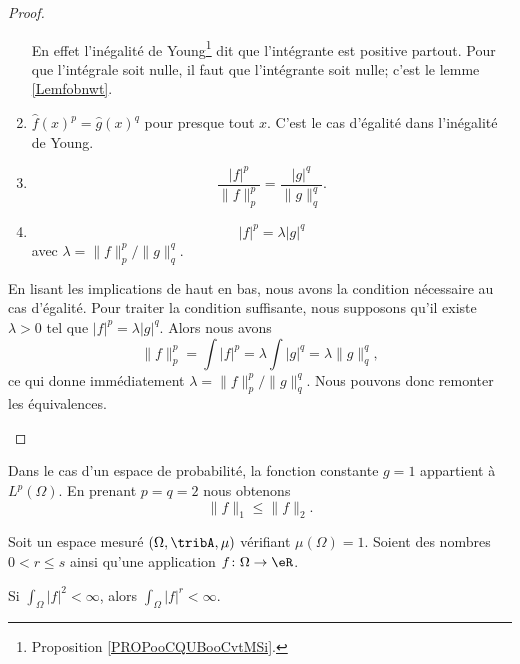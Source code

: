 \begin{proof}
\begin{subproof}
\begin{subproof}
\begin{enumerate}
				      En effet l'inégalité de Young\footnote{Proposition \ref{PROPooCQUBooCvtMSi}.} dit que l'intégrante est positive partout. Pour que l'intégrale soit nulle, il faut que l'intégrante soit nulle; c'est le lemme \ref{Lemfobnwt}.
				\item \( \hat f(x)^p=\hat g(x)^q\) pour presque tout \( x\). C'est le cas d'égalité dans l'inégalité de Young.
				\item
				      \begin{equation}
					      \frac{ | f |^p }{ \| f \|_p^p }=\frac{ | g |^q }{ \| g \|_q^q }.
				      \end{equation}
				\item
				      \begin{equation}
					      | f |^p=\lambda | g |^q
				      \end{equation}
				      avec \( \lambda=\| f \|_p^p/\| g \|_q^q\).
			\end{enumerate}
			\spitem[Conclusion]
			En lisant les implications de haut en bas, nous avons la condition nécessaire au cas d'égalité. Pour traiter la condition suffisante, nous supposons qu'il existe \( \lambda>0\) tel que \( | f |^p=\lambda| g |^q\). Alors nous avons
			\begin{equation}
				\| f \|_p^p=\int| f |^p=\lambda\int| g |^q=\lambda\| g \|_q^q,
			\end{equation}
			ce qui donne immédiatement \( \lambda=\| f \|_p^p/\| g \|_q^q\). Nous pouvons donc remonter les équivalences.
		\end{subproof}
	\end{subproof}
\end{proof}


\begin{remark}      \label{RemNormuptNird}
	Dans le cas d'un espace de probabilité, la fonction constante \( g=1\) appartient à \( L^p(\Omega)\). En prenant \( p=q=2\) nous obtenons
	\begin{equation}
		\| f \|_1\leq\| f \|_2.
	\end{equation}
\end{remark}

\begin{proposition}		\label{PROPooDVCCooKqbAwo}
	Soit un espace mesuré \( (\Omega,\tribA,\mu)\) vérifiant \( \mu(\Omega)=1\). Soient des nombres \( 0<r\leq s\) ainsi qu'une application \(f \colon \Omega\to \eR  \).

	Si \( \int_{\Omega}| f |^2<\infty\), alors \( \int_{\Omega}| f |^r<\infty\).
\end{proposition}

